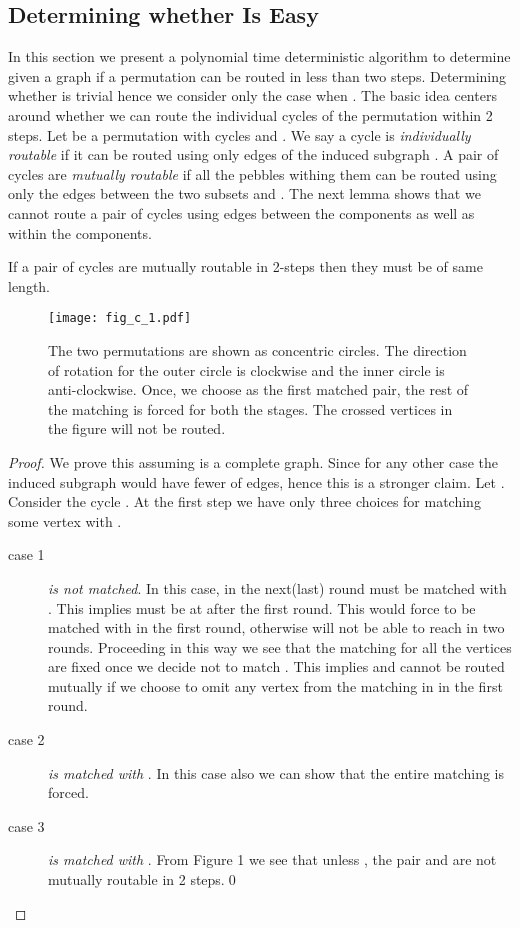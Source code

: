 \documentclass[runningheads,a4paper]{llncs}
\begin{document}
\subsection{Determining whether  Is Easy}
In this section we present a polynomial time deterministic algorithm to determine given a graph if a permutation can be routed in less than two steps. Determining whether  is trivial hence we consider only the case when .  The basic idea centers around whether we can route the individual cycles of the permutation within 2 steps. Let  be a permutation with  cycles and . We say a cycle  is  \textit{individually routable } if it can be routed using only edges of the induced subgraph . A pair of cycles  are \textit{mutually routable} if all the pebbles withing them can be routed using only the edges between the two subsets  and . The next lemma shows that we cannot route  a pair of cycles using edges between the components as well as within the components.

\begin{lemma}
	If a pair of cycles are mutually routable in 2-steps then they must be of same length.
\end{lemma}

\begin{figure}[h]
	\texttt{[image: fig\_c\_1.pdf]}
	\centering
	\caption{The two permutations are shown as concentric circles. The direction of rotation for the outer circle is clockwise and the inner circle is anti-clockwise. Once, we choose  as the first matched pair, the rest of the matching is forced for both the stages. The crossed vertices in the figure will not be routed.} 
\end{figure}

\begin{proof}
	We prove this assuming  is a complete graph. Since for any other case the induced subgraph  would have fewer of edges, hence this is a stronger claim. Let . Consider the cycle . At the first step we have only three choices for matching some vertex with . 
	\begin{description}
		\item[case 1] \textit{ is not matched}. In this case, in the next(last) round  must be matched with . This implies  must be at  after the first round. This would force  to be matched with  in the first round, otherwise  will not be able to reach  in two rounds. Proceeding in this way we see that the matching for all the vertices are fixed once we decide not to match . This implies  and  cannot be routed mutually if we choose to omit any vertex from the matching in  in the first round.
		\item[case 2] \textit{ is matched with }. In  this case also we can show that the entire matching is forced. 
		\item[case 3] \textit{ is matched with }. From Figure 1 we see that unless ,  the pair  and  are not mutually routable in 2 steps.\qed
	\end{description}
\end{proof}
\end{document}
